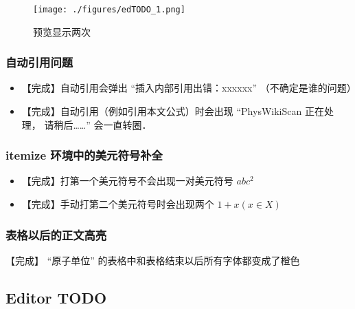 \begin{figure}[ht]
\centering
\texttt{[image: ./figures/edTODO\_1.png]}
\caption{预览显示两次} \label{edTODO_fig1}
\end{figure}

\subsubsection{自动引用问题}
\begin{itemize}
\item 【完成】自动引用会弹出 “插入内部引用出错：xxxxxx” （不确定是谁的问题）
\item 【完成】自动引用（例如引用本文公式）时会出现 “PhysWikiScan 正在处理， 请稍后……” 会一直转圈．
\end{itemize}

\subsubsection{itemize 环境中的美元符号补全}
\begin{itemize}
\item 【完成】打第一个美元符号不会出现一对美元符号 $abc^2$

\item 【完成】手动打第二个美元符号时会出现两个 $1 + x (x \in X)$
\end{itemize}

\subsubsection{表格以后的正文高亮}
【完成】 “原子单位” 的表格中和表格结束以后所有字体都变成了橙色

\subsection{Editor TODO}

